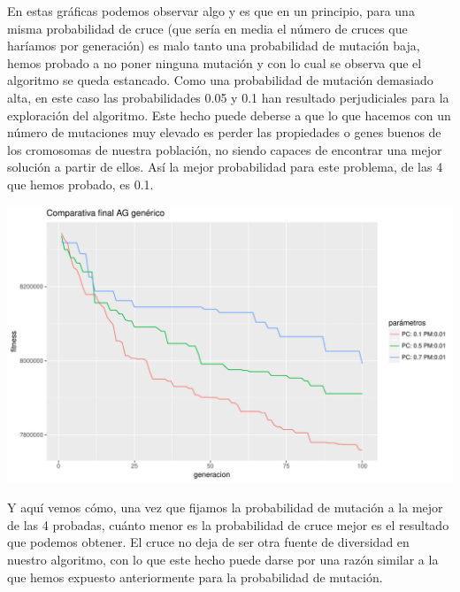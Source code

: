 \documentclass[10pt,a4paper]{article}
\begin{document}
En estas gráficas podemos observar algo y es que en un principio, para una misma probabilidad de cruce (que sería en media el número de cruces que haríamos por generación) es malo tanto una probabilidad de mutación baja, hemos probado a no poner ninguna mutación y con lo cual se observa que el algoritmo se queda estancado. Como una probabilidad de mutación demasiado alta, en este caso las probabilidades 0.05 y 0.1 han resultado perjudiciales para la exploración del algoritmo. Este hecho puede deberse a que lo que hacemos con un número de mutaciones muy elevado es perder las propiedades o genes buenos de los cromosomas de nuestra población, no siendo capaces de encontrar una mejor solución a partir de ellos. Así la mejor probabilidad para este problema, de las 4 que hemos probado, es 0.1.

\includegraphics[width = \textwidth]{img/graphics/GAgenericFinal.pdf}

Y aquí vemos cómo, una vez que fijamos la probabilidad de mutación a la mejor de las 4 probadas, cuánto menor es la probabilidad de cruce mejor es el resultado que podemos obtener. El cruce no deja de ser otra fuente de diversidad en nuestro algoritmo, con lo que este hecho puede darse por una razón similar a la que hemos expuesto anteriormente para la probabilidad de mutación.\\
\end{document}
